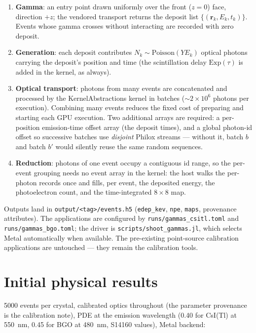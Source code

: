 \documentclass[11pt,a4paper]{article}
\newcommand{\code}[1]{\texttt{#1}}
\newcommand{\csitl}{CsI(Tl)}
\begin{document}
\begin{enumerate}
  \item \textbf{Gamma}: an entry point drawn uniformly over the front ($z=0$) face,
    direction $+z$; the vendored transport returns the deposit list
    $\{(\mathbf{r}_k, E_k, t_k)\}$. Events whose gamma crosses without interacting are
    recorded with zero deposit.
  \item \textbf{Generation}: each deposit contributes
    $N_k \sim \mathrm{Poisson}(Y E_k)$ optical photons carrying the deposit's position
    and time (the scintillation delay $\mathrm{Exp}(\tau)$ is added in the kernel, as
    always).
  \item \textbf{Optical transport}: photons from many events are concatenated and
    processed by the KernelAbstractions kernel in batches
    ($\sim$$2\times10^6$ photons per execution). Combining many events reduces the
    fixed cost of preparing and starting each GPU execution. Two additional arrays are
    required: a per-position emission-time
    offset array (the deposit times), and a global photon-id offset so successive
    batches use \emph{disjoint} Philox streams --- without it, batch $b$ and batch
    $b'$ would silently reuse the same random sequences.
  \item \textbf{Reduction}: photons of one event occupy a contiguous id range, so the
    per-event grouping needs no event array in the kernel: the host walks the
    per-photon records once and fills, per event, the deposited energy, the
    photoelectron count, and the time-integrated $8\times8$ map.
\end{enumerate}

Outputs land in \code{output/<tag>/events.h5} (\code{edep\_kev}, \code{npe},
\code{maps}, provenance attributes). The applications are configured by
\code{runs/gammas\_csitl.toml} and \code{runs/gammas\_bgo.toml}; the driver is
\code{scripts/shoot\_gammas.jl}, which selects Metal automatically when available.
The pre-existing point-source calibration applications are untouched --- they remain
the calibration tools.

\section{Initial physical results}

5000 events per crystal, calibrated optics throughout (the parameter provenance is
the calibration note), PDE at the emission wavelength (0.40 for \csitl{} at 550~nm,
0.45 for BGO at 480~nm, S14160 values), Metal backend:
\end{document}
